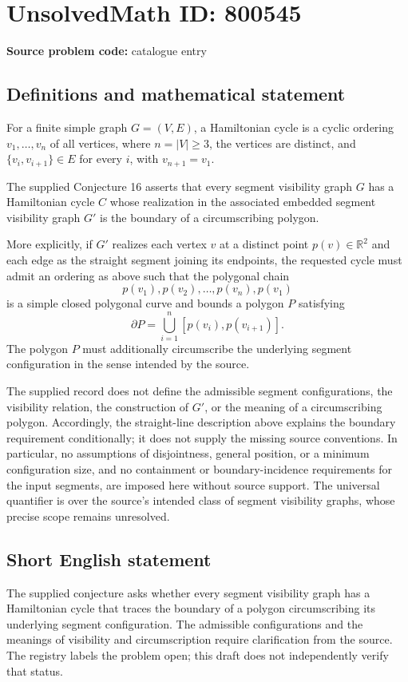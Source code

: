 \documentclass[11pt]{article}
\newcommand{\R}{\mathbb{R}}
\begin{document}
\section*{UnsolvedMath ID: 800545}
\textbf{Source problem code:} catalogue entry
\subsection{Definitions and mathematical statement}
For a finite simple graph \(G=(V,E)\), a Hamiltonian cycle is a cyclic ordering \(v_1,\ldots,v_n\) of all vertices, where \(n=|V|\geq 3\), the vertices are distinct, and \(\{v_i,v_{i+1}\}\in E\) for every \(i\), with \(v_{n+1}=v_1\).

The supplied Conjecture 16 asserts that every segment visibility graph \(G\) has a Hamiltonian cycle \(C\) whose realization in the associated embedded segment visibility graph \(G'\) is the boundary of a circumscribing polygon.

More explicitly, if \(G'\) realizes each vertex \(v\) at a distinct point \(p(v)\in\R^2\) and each edge as the straight segment joining its endpoints, the requested cycle must admit an ordering as above such that the polygonal chain
\[
p(v_1),p(v_2),\ldots,p(v_n),p(v_1)
\]
is a simple closed polygonal curve and bounds a polygon \(P\) satisfying
\[
\partial P=\bigcup_{i=1}^{n}[p(v_i),p(v_{i+1})].
\]
The polygon \(P\) must additionally circumscribe the underlying segment configuration in the sense intended by the source.

The supplied record does not define the admissible segment configurations, the visibility relation, the construction of \(G'\), or the meaning of a circumscribing polygon. Accordingly, the straight-line description above explains the boundary requirement conditionally; it does not supply the missing source conventions. In particular, no assumptions of disjointness, general position, or a minimum configuration size, and no containment or boundary-incidence requirements for the input segments, are imposed here without source support. The universal quantifier is over the source's intended class of segment visibility graphs, whose precise scope remains unresolved.
\subsection{Short English statement}
The supplied conjecture asks whether every segment visibility graph has a Hamiltonian cycle that traces the boundary of a polygon circumscribing its underlying segment configuration. The admissible configurations and the meanings of visibility and circumscription require clarification from the source. The registry labels the problem open; this draft does not independently verify that status.
\end{document}
